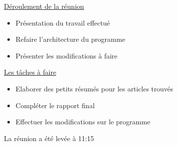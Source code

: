 \documentclass{report}
\begin{document}
\begin{appendices}
\underline{Déroulement de la réunion}\\
\begin{itemize}
	\item Présentation du travail effectué
	\item Refaire l’architecture du programme
	\item Présenter les modifications à faire\\
\end{itemize}

\underline{Les tâches à faire} \\
\begin{itemize}
	\item Elaborer des petits résumés pour les articles trouvés
	\item Compléter le rapport final
	\item Effectuer les modifications sur le programme\\
\end{itemize}

La réunion a été levée à 11:15\\


\end{appendices}
\end{document}
